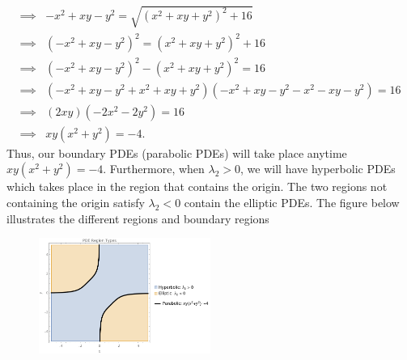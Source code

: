 \documentclass[a4paper,12pt]{article}
\begin{document}
\begin{enumerate}[label = \textbf{(\alph*)}]
\begin{align*}
                \implies & -x^2 + x y - y^2 = \sqrt{\left(x^2+x y+y^2\right)^2+16} \\
                \implies & \left(-x^2 + x y - y^2 \right)^2 = \left(x^2+x y+y^2\right)^2 +16 \\
                \implies & \left(-x^2 + x y - y^2 \right)^2 - \left(x^2+x y+y^2\right)^2 = 16 \\
                \implies & \left(-x^2 + x y - y^2 + x^2+x y+y^2\right)\left(-x^2 + x y - y^2 - x^2 - x y - y^2\right) = 16\\
                \implies & \left(2x y\right)\left(-2x^2 - 2y^2\right) = 16 \\
                \implies & x y\left(x^2 + y^2\right) = -4.
            \end{align*}
            Thus, our boundary PDEs (parabolic PDEs) will take place anytime $ x y\left(x^2 + y^2\right) = -4 $. Furthermore, when $ \lambda_2 > 0 $, we will have hyperbolic PDEs which takes place in the region that contains the origin. The two regions not containing the origin satisfy $ \lambda_2 < 0 $ contain the elliptic PDEs. The figure below illustrates the different regions and boundary regions
            \begin{figure}[h!]
                \centering
                \includegraphics[width = 0.5\textwidth]{images/PDE_Types.png}
            \end{figure}
     \end{enumerate}
\end{document}
